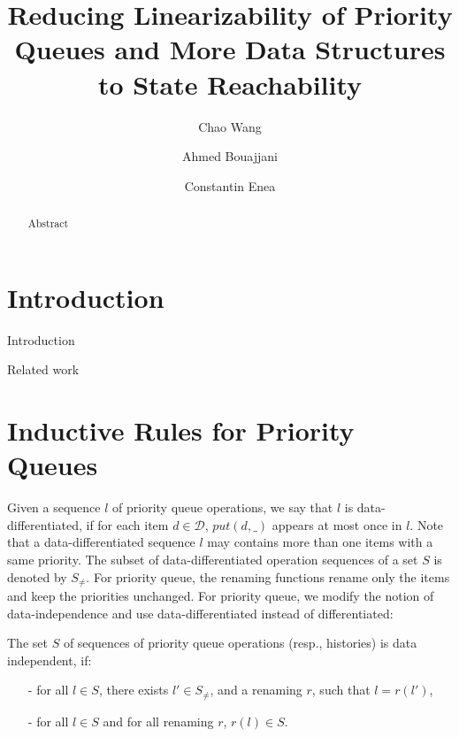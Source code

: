\documentclass{llncs}
\title{Reducing Linearizability of Priority Queues and More Data Structures to State Reachability}
\author {Chao Wang \and Ahmed Bouajjani \and Constantin Enea}
\institute{Institut de Recherche en Informatique Fondamentale, \\Univ. Paris Diderot (Paris 7)
}
\newcommand{\forget}[1]{}
\begin{document}
\maketitle

\begin{abstract}
Abstract
\end{abstract}

\forget{
\noindent Keywords: weak memory model, $\textit{linearizability}$,
$\textit{TSO-to-TSO linearizability}$
}



\section{Introduction}
\label{sec:introduction}
Introduction


\smallskip

\noindent Related work



\section{Inductive Rules for Priority Queues}
\label{sec:inductive rules for priority queues}

Given a sequence $l$ of priority queue operations, we say that $l$ is data-differentiated, if for each item $d \in \mathcal{D}$, $\textit{put}(d,\_)$ appears at most once in $l$. Note that a data-differentiated sequence $l$ may contains more than one items with a same priority. The subset of data-differentiated operation sequences of a set $S$ is denoted by $S_{\neq}$. For priority queue, the renaming functions rename only the items and keep the priorities unchanged. For priority queue, we modify the notion of data-independence \cite{Wolper:1986} and use data-differentiated instead of differentiated:

\begin{definition}\label{def:priority-value data-independence}
The set $S$ of sequences of priority queue operations (resp., histories)  is data independent, if:
\begin{itemize}
\setlength{\itemsep}{0.5pt}
\item[-] for all $l \in S$, there exists $l' \in S_{\neq}$, and a renaming $r$, such that $l=r(l')$,

\item[-] for all $l \in S$ and for all renaming $r$, $r(l) \in S$.
\end{itemize}
\end{definition}
\end{document}
